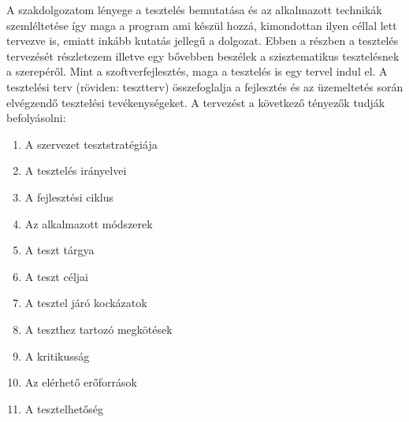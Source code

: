 
A szakdolgozatom lényege a tesztelés bemutatása és az alkalmazott technikák szemléltetése így maga a program ami készül hozzá, kimondottan ilyen céllal lett tervezve is, emiatt inkább kutatás jellegű a dolgozat. Ebben a részben a tesztelés tervezését részletezem illetve egy bővebben beszélek a szisztematikus tesztelésnek a szerepéről.
Mint a szoftverfejlesztés, maga a tesztelés is egy tervel indul el.
A tesztelési terv (röviden: tesztterv) összefoglalja a fejlesztés és az üzemeltetés során elvégzendő tesztelési tevékenységeket. A tervezést a következő tényezők tudják befolyásolni:
\begin{enumerate}
\item A szervezet tesztstratégiája
\item A tesztelés irányelvei
\item A fejlesztési ciklus
\item Az alkalmazott módszerek
\item A teszt tárgya
\item A teszt céljai
\item A tesztel járó kockázatok
\item A teszthez tartozó megkötések
\item A kritikusság
\item Az elérhető erőforrások
\item A tesztelhetőség
\end{enumerate}

